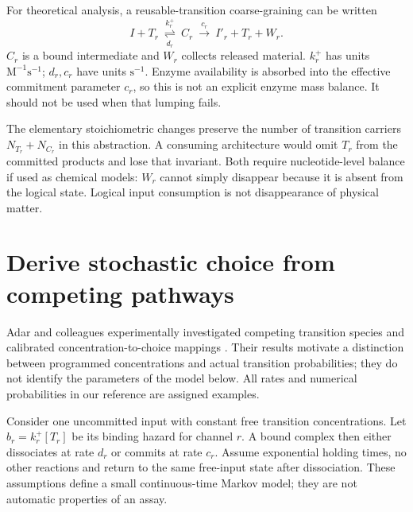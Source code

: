 For theoretical analysis, a reusable-transition coarse-graining can be written
\begin{equation}
 I+T_r\ \underset{d_r}{\stackrel{k_r^+}{\rightleftharpoons}}\ C_r
 \ \xrightarrow{c_r}\ I'_r+T_r+W_r.
 \label{eq:chemical}
\end{equation}
$C_r$ is a bound intermediate and $W_r$ collects released material.
$k_r^+$ has units $\mathrm{M}^{-1}\mathrm{s}^{-1}$; $d_r,c_r$ have units
$\mathrm{s}^{-1}$. Enzyme availability is absorbed into the effective
commitment parameter $c_r$, so this is not an explicit enzyme mass balance.
It should not be used when that lumping fails.

The elementary stoichiometric changes preserve the number of transition
carriers $N_{T_r}+N_{C_r}$ in this abstraction. A consuming architecture
would omit $T_r$ from the committed products and lose that invariant. Both
require nucleotide-level balance if used as chemical models: $W_r$ cannot
simply disappear because it is absent from the logical state. Logical input
consumption is not disappearance of physical matter.

\section{Derive stochastic choice from competing pathways}
Adar and colleagues experimentally investigated competing transition species
and calibrated concentration-to-choice mappings \cite{Adar2004}. Their results
motivate a distinction between programmed concentrations and actual transition
probabilities; they do not identify the parameters of the model below.
All rates and numerical probabilities in our reference are assigned examples.

Consider one uncommitted input with constant free transition concentrations.
Let $b_r=k_r^+[T_r]$ be its binding hazard for channel $r$. A bound complex
then either dissociates at rate $d_r$ or commits at rate $c_r$.
Assume exponential holding times, no other reactions and return to the same
free-input state after dissociation. These assumptions define a small
continuous-time Markov model; they are not automatic properties of an assay.

